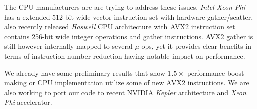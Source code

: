 \documentclass[a4paper]{llncs}
\begin{document}
The CPU manufacturers are are trying to address these issues. \emph{Intel Xeon
Phi} has a extended 512-bit wide vector instruction set with hardware
gather/scatter, also recently released \emph{Haswell} CPU architecture with
AVX2 instruction set contains 256-bit wide integer operations and gather
instructions. AVX2 gather is still however internally mapped to several
$\mu$-ops, yet it provides clear benefits in terms of instruction number
reduction having notable impact on performance.

We already have some preliminary results that show $1.5\times$ performance
boost making or CPU implementation utilize some of new AVX2 instructions. We
are also working to port our code to recent NVIDIA \emph{Kepler} architecture
and \emph{Xeon Phi} accelerator.

\end{document}
